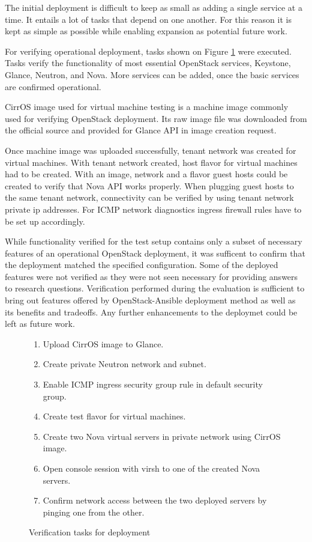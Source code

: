 \documentclass[officiallayout]{tktla}
\begin{document}
The initial deployment is difficult to keep as small as adding a single service
at a time. It entails a lot of tasks that depend on one another. For this
reason it is kept as simple as possible while enabling expansion as potential
future work.

For verifying operational deployment, tasks shown on Figure
\ref{fig:verify-tasks} were executed. Tasks verify the functionality of most
essential OpenStack services, Keystone, Glance, Neutron, and Nova. More
services can be added, once the basic services are confirmed operational.

CirrOS image used for virtual machine testing is a machine image commonly used
for verifying OpenStack deployment. Its raw image file was downloaded from the
official source and provided for Glance API in image creation request.

Once machine image was uploaded successfully, tenant network was created for
virtual machines. With tenant network created, host flavor for virtual machines
had to be created. With an image, network and a flavor guest hosts could be
created to verify that Nova API works properly. When plugging guest hosts to
the same tenant network, connectivity can be verified by using tenant network
private ip addresses. For ICMP network diagnostics ingress firewall rules have
to be set up accordingly.

While functionality verified for the test setup contains only a subset of
necessary features of an operational OpenStack deployment, it was sufficent to
confirm that the deployment matched the specified configuration. Some of the
deployed features were not verified as they were not seen necessary for
providing answers to research questions. Verification performed during the
evaluation is sufficient to bring out features offered by OpenStack-Ansible
deployment method as well as its benefits and tradeoffs. Any further
enhancements to the deploymet could be left as future work.

\begin{figure}[t]
\centering
\begin{enumerate}
  \itemsep0em
  \item Upload CirrOS image to Glance.
  \item Create private Neutron network and subnet.
  \item Enable ICMP ingress security group rule in default security group.
  \item Create test flavor for virtual machines.
  \item Create two Nova virtual servers in private network using CirrOS image.
  \item Open console session with virsh to one of the created Nova servers.
  \item Confirm network access between the two deployed servers by pinging one
        from the other.
\end{enumerate}
\caption{Verification tasks for deployment}
\label{fig:verify-tasks}
\end{figure}
\end{document}

